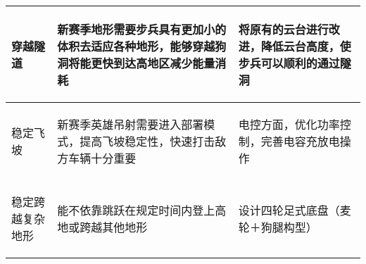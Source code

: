 \begin{longtable}{ p{2cm} | p{7.8cm} | p{6cm} |}
    \hline
    
        \begin{center}
            穿越隧道 
        \end{center} \cellcolor{gndcolor} &
        \begin{center}
            新赛季地形需要步兵具有更加小的体积去适应各种地形，能够穿越狗洞将能更快到达高地区减少能量消耗
        \end{center} \cellcolor{gndcolor} &
        \begin{center}
            将原有的云台进行改进，降低云台高度，使步兵可以顺利的通过隧洞
        \end{center} \cellcolor{gndcolor} \\

    \hline
    
        \begin{center}
            稳定飞坡
        \end{center} &
        \begin{center}
            新赛季英雄吊射需要进入部署模式，提高飞坡稳定性，快速打击敌方车辆十分重要
        \end{center} &
        \begin{center}
            电控方面，优化功率控制，完善电容充放电操作
        \end{center} \\
        
    \hline
    
        \begin{center}
            稳定跨越复杂地形
        \end{center} &
        \begin{center}
            能不依靠跳跃在规定时间内登上高地或跨越其他地形
        \end{center} &
        \begin{center}
            设计四轮足式底盘（麦轮＋狗腿构型）
        \end{center} \\

    \hline
    

\end{longtable}
